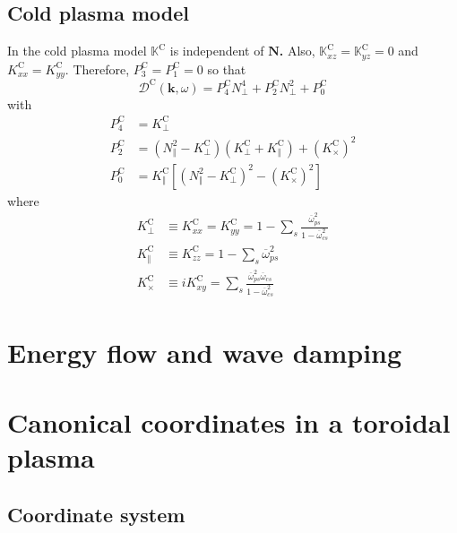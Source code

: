 \documentclass[a4paper,12pt]{article}%
\begin{document}
\subsection{Cold plasma model}

In the cold plasma model $\mathbb{K}^{\text{C}}$ is independent of
$\mathbf{N}$\textbf{.} Also, $\mathbb{K}_{xz}^{\text{C}}=\mathbb{K}%
_{yz}^{\text{C}}=0$ and $K_{xx}^{\text{C}}=K_{yy}^{\text{C}}$. Therefore,
$P_{3}^{\text{C}}=P_{1}^{\text{C}}=0$ so that
\[
\mathcal{D}^{\text{C}}\left(  \mathbf{k},\omega\right)  =P_{4}^{\text{C}%
}N_{\bot}^{4}+P_{2}^{\text{C}}N_{\bot}^{2}+P_{0}^{\text{C}}%
\]
with%
\begin{align}
P_{4}^{\text{C}} &  =K_{\bot}^{\text{C}}\\
P_{2}^{\text{C}} &  =\left(  N_{\Vert}^{2}-K_{\bot}^{\text{C}}\right)  \left(
K_{\bot}^{\text{C}}+K_{\Vert}^{\text{C}}\right)  +\left(  K_{\times}%
^{\text{C}}\right)  ^{2}\\
P_{0}^{\text{C}} &  =K_{\Vert}^{\text{C}}\left[  \left(  N_{\Vert}^{2}%
-K_{\bot}^{\text{C}}\right)  ^{2}-\left(  K_{\times}^{\text{C}}\right)
^{2}\right]
\end{align}
where
\begin{align}
K_{\bot}^{\text{C}} &  \equiv K_{xx}^{\text{C}}=K_{yy}^{\text{C}}=1-\sum
_{s}\frac{\overline{\omega}_{ps}^{2}}{1-\overline{\omega}_{cs}^{2}}\\
K_{\Vert}^{\text{C}} &  \equiv K_{zz}^{\text{C}}=1-\sum_{s}\overline{\omega
}_{ps}^{2}\\
K_{\times}^{\text{C}} &  \equiv iK_{xy}^{\text{C}}=\sum_{s}\frac
{\overline{\omega}_{ps}^{2}\overline{\omega}_{cs}}{1-\overline{\omega}%
_{cs}^{2}}%
\end{align}


\section{Energy flow and wave damping}

\section{Canonical coordinates in a toroidal plasma}

\subsection{Coordinate system}
\end{document}
